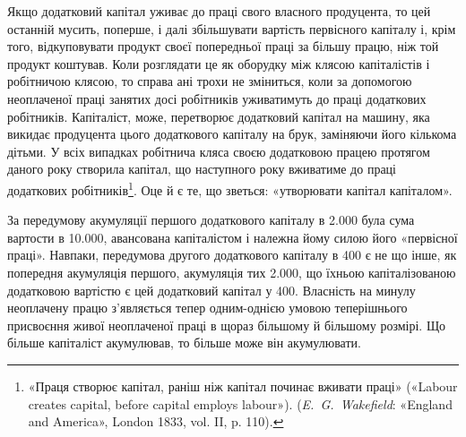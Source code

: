 Якщо додатковий капітал уживає до праці свого власного
продуцента, то цей останній мусить, поперше, і далі збільшувати
вартість первісного капіталу і, крім того, відкуповувати продукт
своєї попередньої праці за більшу працю, ніж той продукт коштував.
Коли розглядати це як оборудку між клясою капіталістів
і робітничою клясою, то справа ані трохи не зміниться,
коли за допомогою неоплаченої праці занятих досі робітників
уживатимуть до праці додаткових робітників. Капіталіст, може,
перетворює додатковий капітал на машину, яка викидає продуцента
цього додаткового капіталу на брук, заміняючи його
кількома дітьми. У всіх випадках робітнича кляса своєю додатковою
працею протягом даного року створила капітал, що наступного
року вживатиме до праці додаткових робітників\footnote{
«Праця створює капітал, раніш ніж капітал починає вживати
праці» («Labour creates capital, before capital employs labour»). (\emph{E.~G.~Wakefield}: «England and America», London 1833, vol. II, p. 110).
}. Оце й є те, що зветься: «утворювати капітал капіталом».

За передумову акумуляції першого додаткового капіталу в
\num{2.000} була сума вартости в \num{10.000},
авансована капіталістом і належна йому силою його
«первісної праці». Навпаки, передумова другого додаткового
капіталу в 400 є не що інше, як попередня акумуляція
першого, акумуляція тих \num{2.000}, що
їхньою капіталізованою додатковою вартістю є цей додатковий
капітал у 400. Власність на минулу неоплачену
працю з’являється тепер одним-однією умовою теперішнього
присвоєння живої неоплаченої праці в щораз більшому й
більшому розмірі. Що більше капіталіст акумулював, то більше
може він акумулювати.

